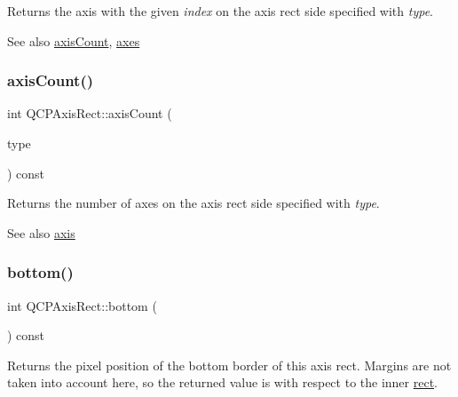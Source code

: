 Returns the axis with the given {\itshape index} on the axis rect side specified with {\itshape type}.

\begin{DoxySeeAlso}{See also}
\mbox{\hyperlink{class_q_c_p_axis_rect_a85b321acec0f694d8b5fdeafdbff3133}{axis\+Count}}, \mbox{\hyperlink{class_q_c_p_axis_rect_a8db4722cb93e9c4a6f0d91150c200867}{axes}} 
\end{DoxySeeAlso}
\mbox{\label{class_q_c_p_axis_rect_a85b321acec0f694d8b5fdeafdbff3133}} 
\subsubsection{\texorpdfstring{axis\+Count()}{axisCount()}}
{\footnotesize\ttfamily int Q\+C\+P\+Axis\+Rect\+::axis\+Count (\begin{DoxyParamCaption}\item[{\mbox{\hyperlink{class_q_c_p_axis_ae2bcc1728b382f10f064612b368bc18a}{Q\+C\+P\+Axis\+::\+Axis\+Type}}}]{type }\end{DoxyParamCaption}) const}

Returns the number of axes on the axis rect side specified with {\itshape type}.

\begin{DoxySeeAlso}{See also}
\mbox{\hyperlink{class_q_c_p_axis_rect_a583ae4f6d78b601b732183f6cabecbe1}{axis}} 
\end{DoxySeeAlso}
\mbox{\label{class_q_c_p_axis_rect_acefdf1abaa8a8ab681e906cc2be9581e}} 
\subsubsection{\texorpdfstring{bottom()}{bottom()}}
{\footnotesize\ttfamily int Q\+C\+P\+Axis\+Rect\+::bottom (\begin{DoxyParamCaption}{ }\end{DoxyParamCaption}) const\hspace{0.3cm}{\ttfamily [inline]}}

Returns the pixel position of the bottom border of this axis rect. Margins are not taken into account here, so the returned value is with respect to the inner \mbox{\hyperlink{class_q_c_p_layout_element_a208effccfe2cca4a0eaf9393e60f2dd4}{rect}}. \mbox{\label{class_q_c_p_axis_rect_ab15d4311d6535ccd7af504dc0e2b98c6}} 

